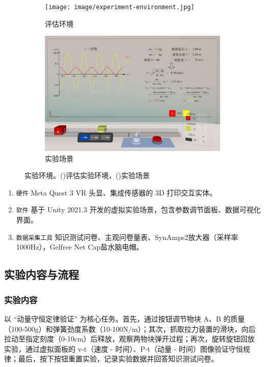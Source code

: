 \documentclass[runningheads]{llncs}
\begin{document}
\begin{figure}
  \begin{subfigure}{0.32\linewidth}
    \centering
    \texttt{[image: image/experiment-environment.jpg]}
    \caption{评估环境}
    \label{fig:experimental-introduction}
  \end{subfigure}
  \hfill
  \begin{subfigure}{0.64\linewidth}
    \centering
    \includegraphics[width=\linewidth]{image/experiment-scenario.pdf}
    \caption{实验场景}
    \label{fig:experimental-operation}
  \end{subfigure}
  \caption{实验环境。()评估实验环境，()实验场景}
  \label{fig:experimental-show}
\end{figure}

\begin{enumerate}[label={$\bullet$}]
  \item \texttt{硬件} Meta Quest 3 VR 头显、集成传感器的 3D 打印交互实体。
  \item \texttt{软件} 基于 Unity 2021.3 开发的虚拟实验场景，包含参数调节面板、数据可视化界面。
  \item \texttt{数据采集工具} 知识测试问卷、主观问卷量表、SynAmps2放大器（采样率1000Hz），Gelfree Net Cap盐水脑电帽。
\end{enumerate}

\subsection{实验内容与流程}
\subsubsection{实验内容}
以 “动量守恒定律验证” 为核心任务。首先，通过按钮调节物块 A、B 的质量（100-500g）和弹簧劲度系数（10-100N/m）；其次，抓取拉力装置的滑块，向后拉动至指定刻度（0-10cm）后释放，观察两物块弹开过程；再次，旋转旋钮回放实验，通过虚拟面板的 v-t（速度 - 时间）、P-t（动量 - 时间）图像验证守恒规律；最后，按下按钮重置实验，记录实验数据并回答知识测试问卷。
\end{document}

